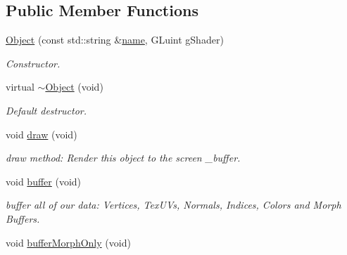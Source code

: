 \subsection*{Public Member Functions}
\begin{DoxyCompactItemize}
\item 
\hyperlink{class_object_aacf42e81415f32f1f2a105ce29c7c1b9}{Object} (const std\-::string \&\hyperlink{class_object_aafd766fce2598f718cac97a3ac731706}{name}, G\-Luint g\-Shader)
\begin{DoxyCompactList}\small\item\em Constructor. \end{DoxyCompactList}\item 
\hypertarget{class_object_ac9ec2177266554587e8ddb40eb72ae1c}{virtual \hyperlink{class_object_ac9ec2177266554587e8ddb40eb72ae1c}{$\sim$\-Object} (void)}\label{class_object_ac9ec2177266554587e8ddb40eb72ae1c}

\begin{DoxyCompactList}\small\item\em Default destructor. \end{DoxyCompactList}\item 
\hypertarget{class_object_a53e2ee7f548550be014126bed139fe69}{void \hyperlink{class_object_a53e2ee7f548550be014126bed139fe69}{draw} (void)}\label{class_object_a53e2ee7f548550be014126bed139fe69}

\begin{DoxyCompactList}\small\item\em draw method\-: Render this object to the screen \-\_\-buffer. \end{DoxyCompactList}\item 
\hypertarget{class_object_a7edb92c30d86b6479b0ff2a5e9f06e13}{void \hyperlink{class_object_a7edb92c30d86b6479b0ff2a5e9f06e13}{buffer} (void)}\label{class_object_a7edb92c30d86b6479b0ff2a5e9f06e13}

\begin{DoxyCompactList}\small\item\em buffer all of our data\-: Vertices, Tex\-U\-Vs, Normals, Indices, Colors and Morph Buffers. \end{DoxyCompactList}\item 
\hypertarget{class_object_a293792abfe0671e00a0ec10e85ea9d9e}{void \hyperlink{class_object_a293792abfe0671e00a0ec10e85ea9d9e}{buffer\-Morph\-Only} (void)}\label{class_object_a293792abfe0671e00a0ec10e85ea9d9e}


\end{DoxyCompactItemize}
